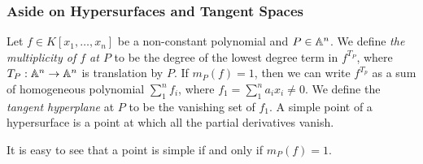     \subsubsection{Aside on Hypersurfaces and Tangent Spaces}
        \begin{definition}
            Let $f\in K[x_1,\dots,x_n]$ be a non-constant polynomial and $P\in \mathbb{A}^n$. We define \textit{the multiplicity of $f$ at $P$} to be the degree of the lowest degree term in $f^{T_P}$, where $T_P : \mathbb{A}^n \rightarrow \mathbb{A}^n$ is translation by $P$. If $m_P(f)=1$, then we can write $f^{T_p}$ as a sum of homogeneous polynomial $\sum_1^n f_i$, where $f_1= \sum_1^n a_ix_i\neq 0$. We define the \textit{tangent hyperplane} at $P$ to be the vanishing set of $f_1$. A simple point of a hypersurface is a point at which all the partial derivatives vanish. 
        \end{definition}
        \begin{remark}
            It is easy to see that a point is simple if and only if $m_P(f)=1$.
        \end{remark}
